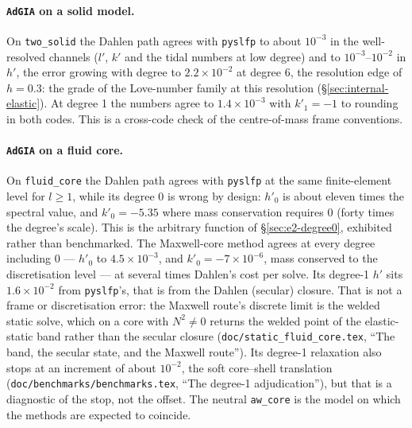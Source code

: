 \documentclass[11pt]{article}
\numberwithin{equation}{section}
\newcommand{\code}[1]{\texttt{#1}}
\begin{document}
\paragraph{\code{AdGIA} on a solid model.} On \code{two\_solid} the Dahlen
path agrees with \code{pyslfp} to about $10^{-3}$ in the well-resolved
channels ($l'$, $k'$ and the tidal numbers at low degree) and to
$10^{-3}$--$10^{-2}$ in $h'$, the error growing with degree to
$2.2\times10^{-2}$ at degree 6, the resolution edge of $h=0.3$: the grade of
the Love-number family at this resolution (\S\ref{sec:internal-elastic}). At degree 1 the numbers agree to
$1.4\times10^{-3}$ with $k'_1=-1$ to rounding in both codes. This is a
cross-code check of the centre-of-mass frame conventions.

\paragraph{\code{AdGIA} on a fluid core.} On \code{fluid\_core} the Dahlen
path agrees with \code{pyslfp} at the same finite-element level for
$l\ge1$, while its degree 0 is wrong by design: $h'_0$ is about eleven times
the spectral value, and $k'_0=-5.35$ where mass conservation requires 0
(forty times the degree's scale). This is the arbitrary function of
\S\ref{sec:e2-degree0}, exhibited rather than benchmarked. The Maxwell-core
method agrees at every degree including 0 --- $h'_0$ to $4.5\times10^{-3}$,
and $k'_0=-7\times10^{-6}$, mass conserved to the discretisation level ---
at several times Dahlen's cost per solve. Its degree-1 $h'$ sits
$1.6\times10^{-2}$ from \code{pyslfp}'s, that is from the Dahlen (secular)
closure. That is not a frame or discretisation error: the Maxwell route's
discrete limit is the welded static solve, which on a core with
$N^2\neq0$ returns the welded point of the elastic-static band rather than
the secular closure (\code{doc/static\_fluid\_core.tex}, ``The band, the
secular state, and the Maxwell route''). Its degree-1 relaxation also stops
at an increment of about $10^{-2}$, the soft core--shell translation
(\code{doc/benchmarks/benchmarks.tex}, ``The degree-1 adjudication''), but that is a
diagnostic of the stop, not the offset. The neutral \code{aw\_core} is the
model on which the methods are expected to coincide.
\end{document}
